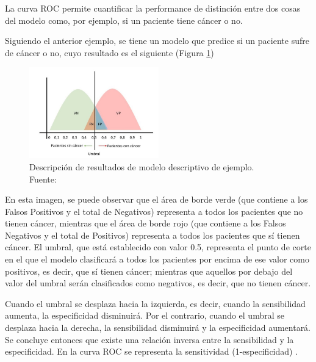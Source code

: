 \begin{itemize}
	La curva ROC permite cuantificar la performance de distinción entre dos cosas del modelo como, por ejemplo, si un paciente tiene cáncer o no.
	
	Siguiendo el anterior ejemplo, se tiene un modelo que predice si un paciente sufre de cáncer o no, cuyo resultado es el siguiente (Figura \ref{3:fig2})
	
	\begin{figure}[htbp]
		\begin{center}
			\includegraphics[width=0.50\textwidth]{3/figures/auc_example.jpg}
			\caption[Descripción de resultados de modelo descriptivo de ejemplo]{Descripción de resultados de modelo descriptivo de ejemplo.\\
				Fuente: \cite{gl_gonzalez2019auc}}
			\label{3:fig2}
		\end{center}
	\end{figure}
	
	En esta imagen, se puede observar que el área de borde verde (que contiene a los Falsos Positivos y el total de Negativos) representa a todos los pacientes que no tienen cáncer, mientras que el área de borde rojo (que contiene a los Falsos Negativos y el total de Positivos) representa a todos los pacientes que sí tienen cáncer. El umbral, que está establecido con valor 0.5, representa el punto de corte en el que el modelo clasificará a todos los pacientes por encima de ese valor como positivos, es decir, que sí tienen cáncer; mientras que aquellos por debajo del valor del umbral serán clasificados como negativos, es decir, que no tienen cáncer.
	
	Cuando el umbral se desplaza hacia la izquierda, es decir, cuando la sensibilidad aumenta, la especificidad disminuirá. Por el contrario, cuando el umbral se desplaza hacia la derecha, la sensibilidad disminuirá y la especificidad aumentará. Se concluye entonces que existe una relación inversa entre la sensibilidad y la especificidad. En la curva ROC se representa la sensitividad (1-especificidad) \parencite{gl_gonzalez2019auc}.
	

\end{itemize}
